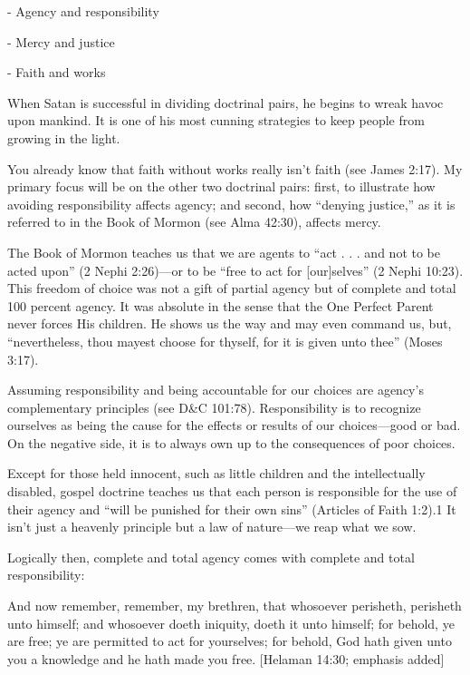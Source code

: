\documentclass[letterpaper, 11pt]{report}
\begin{document}
- Agency and responsibility

- Mercy and justice

- Faith and works


When Satan is successful in dividing doctrinal pairs, he begins to wreak havoc upon mankind. It is one of his most cunning strategies to keep people from growing in the light.

You already know that faith without works really isn’t faith (see James 2:17). My primary focus will be on the other two doctrinal pairs: first, to illustrate how avoiding responsibility affects agency; and second, how “denying justice,” as it is referred to in the Book of Mormon (see Alma 42:30), affects mercy.

The Book of Mormon teaches us that we are agents to “act . . . and not to be acted upon” (2 Nephi 2:26)—or to be “free to act for [our]selves” (2 Nephi 10:23). This freedom of choice was not a gift of partial agency but of complete and total 100 percent agency. It was absolute in the sense that the One Perfect Parent never forces His children. He shows us the way and may even command us, but, “nevertheless, thou mayest choose for thyself, for it is given unto thee” (Moses 3:17).

Assuming responsibility and being accountable for our choices are agency’s complementary principles (see D\&C 101:78). Responsibility is to recognize ourselves as being the cause for the effects or results of our choices—good or bad. On the negative side, it is to always own up to the consequences of poor choices.

Except for those held innocent, such as little children and the intellectually disabled, gospel doctrine teaches us that each person is responsible for the use of their agency and “will be punished for their own sins” (Articles of Faith 1:2).1 It isn’t just a heavenly principle but a law of nature—we reap what we sow.

Logically then, complete and total agency comes with complete and total responsibility:

And now remember, remember, my brethren, that whosoever perisheth, perisheth unto himself; and whosoever doeth iniquity, doeth it unto himself; for behold, ye are free; ye are permitted to act for yourselves; for behold, God hath given unto you a knowledge and he hath made you free. [Helaman 14:30; emphasis added]
\end{document}
